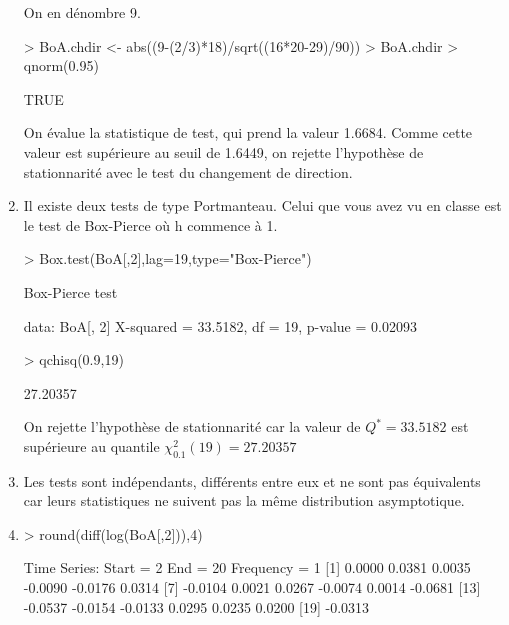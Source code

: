 \begin{solution}{1.6}
\begin{enumerate}
On en dénombre 9.

\begin{Schunk}
\begin{Sinput}
> BoA.chdir <- abs((9-(2/3)*18)/sqrt((16*20-29)/90))
> BoA.chdir > qnorm(0.95)
\end{Sinput}
\begin{Soutput}
[1] TRUE
\end{Soutput}
\end{Schunk}
On évalue la statistique de test, qui prend la valeur 1.6684. Comme cette valeur est supérieure au seuil de 1.6449, on rejette l'hypothèse de stationnarité avec le test du changement de direction.
\item
Il existe deux tests de type Portmanteau. Celui que vous avez vu en classe est le test de Box-Pierce où h commence à 1.
\begin{Schunk}
\begin{Sinput}
> Box.test(BoA[,2],lag=19,type="Box-Pierce")
\end{Sinput}
\begin{Soutput}
	Box-Pierce test

data:  BoA[, 2]
X-squared = 33.5182, df = 19, p-value = 0.02093
\end{Soutput}
\begin{Sinput}
> qchisq(0.9,19)
\end{Sinput}
\begin{Soutput}
[1] 27.20357
\end{Soutput}
\end{Schunk}

On rejette l'hypothèse de stationnarité car la valeur de $Q^{*}=33.5182$ est supérieure au quantile $\chi^2_{0.1}(19) = 27.20357$

\item
Les tests sont indépendants, différents entre eux et ne sont pas équivalents
car leurs statistiques ne suivent pas la même distribution asymptotique.

\item
\begin{Schunk}
\begin{Sinput}
> round(diff(log(BoA[,2])),4)
\end{Sinput}
\begin{Soutput}
Time Series:
Start = 2
End = 20
Frequency = 1
 [1]  0.0000  0.0381  0.0035 -0.0090 -0.0176  0.0314
 [7] -0.0104  0.0021  0.0267 -0.0074  0.0014 -0.0681
[13] -0.0537 -0.0154 -0.0133  0.0295  0.0235  0.0200
[19] -0.0313
\end{Soutput}
\end{Schunk}


\end{enumerate}
\end{solution}
